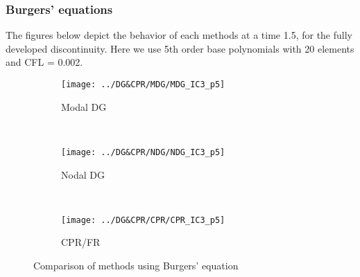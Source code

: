 \begin{frame} \frametitle{Burgers' equations}
The figures below depict the behavior of each methods at a time 1.5, for the fully developed discontinuity. Here we use 5th order base polynomials with 20 elements and CFL = 0.002.
	\begin{figure}
        \centering
        \begin{subfigure}[b]{0.31\textwidth}
                \centering
                \texttt{[image: ../DG\&CPR/MDG/MDG\_IC3\_p5]}
                \caption{Modal DG}
                \label{fig:MDG_IC3_p5}
        \end{subfigure}%
				~
        \begin{subfigure}[b]{0.31\textwidth}
                \centering
                \texttt{[image: ../DG\&CPR/NDG/NDG\_IC3\_p5]}
                \caption{Nodal DG}
                \label{fig:NDG_IC3_p5}
        \end{subfigure}
				~
        \begin{subfigure}[b]{0.31\textwidth}
								\centering
                \texttt{[image: ../DG\&CPR/CPR/CPR\_IC3\_p5]}
                \caption{CPR/FR}
                \label{fig:CPR_IC3_p5}
        \end{subfigure}
				\caption{Comparison of methods using Burgers' equation}
				\label{fig:compareBurgers_p5}
	\end{figure}
\end{frame}

